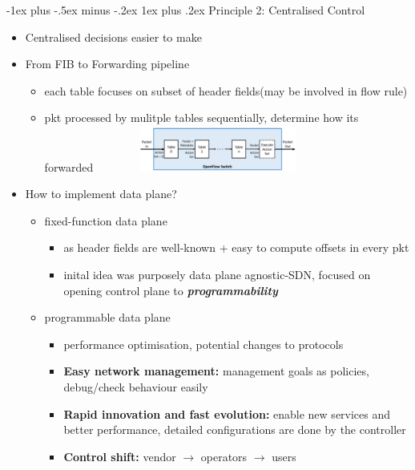 \documentclass[10pt,landscape]{article}
\makeatletter
\newcommand{\subsubsubsection}{\@startsection{subsubsection}{3}{0mm}%
                                {-1ex plus -.5ex minus -.2ex}%
                                {1ex plus .2ex}%
                                {\normalfont\scriptsize\bfseries}}
\makeatother
\begin{document}
\begin{multicols*}{3}
\subsubsubsection{Principle 2: Centralised Control}
\begin{itemize}[topsep=0pt,noitemsep,wide=0pt, leftmargin=\dimexpr{} + 2\relax]
  \item Centralised decisions easier to make
  \item From FIB to Forwarding pipeline
  \begin{itemize}[topsep=0pt,noitemsep,wide=0pt, leftmargin=\dimexpr{} + 2\relax]
    \item each table focuses on subset of header fields(may be involved in flow rule)
    \item pkt processed by mulitple tables sequentially, determine how its forwarded
    \includegraphics*[width=8cm, height=1.5cm]{images/openflowswitch.png}
  \end{itemize}
  \item How to implement data plane?
  \begin{itemize}[topsep=0pt,noitemsep,wide=0pt, leftmargin=\dimexpr{} + 2\relax]
    \item fixed-function data plane
    \begin{itemize}[topsep=0pt,noitemsep,wide=0pt, leftmargin=\dimexpr{} + 2\relax]
      \item as header fields are well-known + easy to compute offsets in every pkt
      \item inital idea was purposely data plane agnostic-SDN, focused on opening control plane to \textit{\textbf{programmability}}
    \end{itemize}
    \item programmable data plane
    \begin{itemize}[topsep=0pt,noitemsep,wide=0pt, leftmargin=\dimexpr{} + 2\relax]
      \item performance optimisation, potential changes to protocols
      \item \textbf{Easy network management:} management goals as policies, debug/check behaviour easily
      \item \textbf{Rapid innovation and fast evolution:} enable new services and better performance, detailed configurations are done by the controller
      \item \textbf{Control shift:} vendor $\rightarrow$ operators $\rightarrow$ users
    \end{itemize}
  \end{itemize}
\end{itemize}


\end{multicols*}
\end{document}
